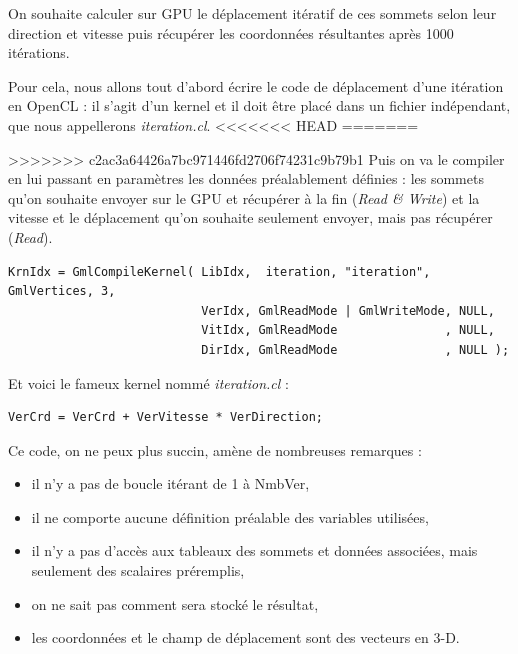\documentclass[a4paper,12pt]{article}
\begin{document}
On souhaite calculer sur GPU le déplacement itératif de ces sommets selon leur direction et vitesse puis récupérer les coordonnées résultantes après 1000 itérations.

Pour cela, nous allons tout d'abord écrire le code de déplacement d'une itération en OpenCL : il s'agit d'un kernel et il doit être placé dans un fichier indépendant, que nous appellerons \emph{iteration.cl}.
<<<<<<< HEAD
=======

>>>>>>> c2ac3a64426a7bc971446fd2706f74231c9b79b1
Puis on va le compiler en lui passant en paramètres les données préalablement définies : les sommets qu'on souhaite envoyer sur le GPU et récupérer à la fin (\emph{Read \& Write}) et la vitesse et le déplacement qu'on souhaite seulement envoyer, mais pas récupérer (\emph{Read}).

\begin{tt}
\begin{verbatim}
KrnIdx = GmlCompileKernel( LibIdx,  iteration, "iteration", GmlVertices, 3,
                           VerIdx, GmlReadMode | GmlWriteMode, NULL,
                           VitIdx, GmlReadMode               , NULL,
                           DirIdx, GmlReadMode               , NULL );
\end{verbatim}
\end{tt}
\normalfont

Et voici le fameux kernel nommé \emph{iteration.cl} : 

\begin{tt}
\begin{verbatim}
VerCrd = VerCrd + VerVitesse * VerDirection;
\end{verbatim}
\end{tt}
\normalfont

Ce code, on ne peux plus succin, amène de nombreuses remarques :

\begin{itemize}
\item il n'y a pas de boucle itérant de 1 à NmbVer,
\item il ne comporte aucune définition préalable des variables utilisées,
\item il n'y a pas d'accès aux tableaux des sommets et données associées, mais seulement des scalaires préremplis,
\item on ne sait pas comment sera stocké le résultat,
\item les coordonnées et le champ de déplacement sont des vecteurs en 3-D.
\end{itemize}
\end{document}
